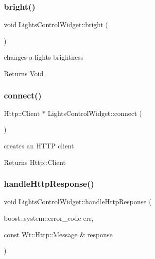 \subsubsection{\texorpdfstring{bright()}{bright()}}
{\footnotesize\ttfamily void Lights\+Control\+Widget\+::bright (\begin{DoxyParamCaption}{ }\end{DoxyParamCaption})\hspace{0.3cm}{\ttfamily [private]}}



changes a light\textquotesingle{}s brightness 

\begin{DoxyReturn}{Returns}
Void 
\end{DoxyReturn}
\mbox{\label{class_lights_control_widget_a4a43f535b11a174e2f9a5b9ffe773557}} 
\subsubsection{\texorpdfstring{connect()}{connect()}}
{\footnotesize\ttfamily Http\+::\+Client $\ast$ Lights\+Control\+Widget\+::connect (\begin{DoxyParamCaption}{ }\end{DoxyParamCaption})\hspace{0.3cm}{\ttfamily [private]}}



creates an H\+T\+TP client 

\begin{DoxyReturn}{Returns}
Http\+::\+Client 
\end{DoxyReturn}
\mbox{\label{class_lights_control_widget_a0fd696e3500ca64cfeddd08738e5b6cf}} 
\subsubsection{\texorpdfstring{handle\+Http\+Response()}{handleHttpResponse()}}
{\footnotesize\ttfamily void Lights\+Control\+Widget\+::handle\+Http\+Response (\begin{DoxyParamCaption}\item[{boost\+::system\+::error\+\_\+code}]{err,  }\item[{const Wt\+::\+Http\+::\+Message \&}]{response }\end{DoxyParamCaption})\hspace{0.3cm}{\ttfamily [private]}}



